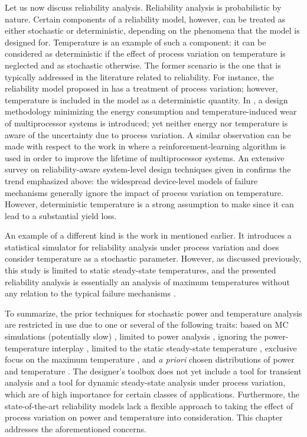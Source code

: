 Let us now discuss reliability analysis. Reliability analysis is probabilistic
by nature. Certain components of a reliability model, however, can be treated as
either stochastic or deterministic, depending on the phenomena that the model is
designed for. Temperature is an example of such a component: it can be
considered as deterministic if the effect of process variation on temperature is
neglected and as stochastic otherwise. The former scenario is the one that is
typically addressed in the literature related to reliability. For instance, the
reliability model proposed in \cite{xiang2010} has a treatment of process
variation; however, temperature is included in the model as a deterministic
quantity. In \cite{das2014a}, a design methodology minimizing the energy
consumption and temperature-induced wear of multiprocessor systems is
introduced; yet neither energy nor temperature is aware of the uncertainty due
to process variation. A similar observation can be made with respect to the work
in \cite{das2014c} where a reinforcement-learning algorithm is used in order to
improve the lifetime of multiprocessor systems. An extensive survey on
reliability-aware system-level design techniques given in \cite{das2014b}
confirms the trend emphasized above: the widespread device-level models of
failure mechanisms generally ignore the impact of process variation on
temperature. However, deterministic temperature is a strong assumption to make
since it can lead to a substantial yield loss.

An example of a different kind is the work in \cite{lee2013} mentioned earlier.
It introduces a statistical simulator for reliability analysis under process
variation and does consider temperature as a stochastic parameter. However, as
discussed previously, this study is limited to static steady-state temperatures,
and the presented reliability analysis is essentially an analysis of maximum
temperatures without any relation to the typical failure mechanisms
\cite{jedec2016}.

To summarize, the prior techniques for stochastic power and temperature analysis
are restricted in use due to one or several of the following traits: based on
\ac{MC} simulations (potentially slow) \cite{chandra2010}, limited to power
analysis \cite{bhardwaj2006, ghanta2006, vrudhula2006, bhardwaj2008, shen2009,
chandra2010}, ignoring the power-temperature interplay \cite{bhardwaj2006,
ghanta2006, vrudhula2006, bhardwaj2008, huang2009a, shen2009}, limited to the
static steady-state temperature \cite{huang2009a, juan2011, juan2012, lee2013},
exclusive focus on the maximum temperature \cite{juan2011}, and \emph{a priori}
chosen distributions of power and temperature \cite{bhardwaj2006,
srivastava2010, juan2012}. The designer's toolbox does not yet include a tool
for transient analysis and a tool for dynamic steady-state analysis under
process variation, which are of high importance for certain classes of
applications. Furthermore, the state-of-the-art reliability models lack a
flexible approach to taking the effect of process variation on power and
temperature into consideration. This chapter addresses the aforementioned
concerns.
